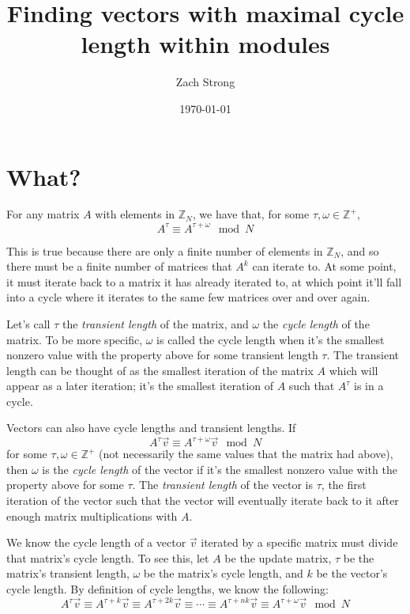 \documentclass[a4paper, 12pt, reqno]{amsart}
\title{Finding vectors with maximal cycle length within modules}
\author{Zach Strong}
\date{\today}
\begin{document}
	\maketitle
	
	\section{What?}
	For any matrix $A$ with elements in $\mathds{Z}_{N}$, we have that, for some $\tau, \omega \in \mathds{Z}^{+}$,
	\[
		A^{\tau} \equiv A^{\tau + \omega} \mod{N}
	\]
	
	This is true because there are only a finite number of elements in $\mathds{Z}_{N}$, and so there must be a
	finite number of matrices that $A^{k}$ can iterate to. At some point, it must iterate back to a matrix it
	has already iterated to, at which point it'll fall into a cycle where it iterates to the same few matrices
	over and over again.
	
	Let's call $\tau$ the \emph{transient length} of the matrix, and $\omega$ the \emph{cycle length} of the matrix.
	To be more specific, $\omega$ is called the cycle length when it's the smallest nonzero value with the
	property above for some transient length $\tau$. The transient length can be thought of as the smallest
	iteration of the matrix $A$ which will appear as a later iteration; it's the smallest iteration of $A$ such that
	$A^{\tau}$ is in a cycle.
	
	Vectors can also have cycle lengths and transient lengths. If
	\[
		A^{\tau}\vec{v} \equiv A^{\tau + \omega}\vec{v} \mod{N}
	\]
	for some $\tau, \omega \in \mathds{Z}^{+}$ (not necessarily the same values that the matrix had above), then
	$\omega$ is the \emph{cycle length} of the vector if it's the smallest nonzero value with the property above
	for some $\tau$. The \emph{transient length} of the vector is $\tau$, the first iteration of the vector such
	that the vector will eventually iterate back to it after enough matrix multiplications with $A$.
	
	We know the cycle length of a vector $\vec{v}$ iterated by a specific matrix must divide that matrix's cycle 
	length. To see this, let $A$ be the update matrix, $\tau$ be the matrix's transient length, $\omega$ be the 
	matrix's cycle length, and $k$ be the vector's cycle length. By definition of cycle lengths, we know the 
	following:
	\[
		A^{\tau}\vec{v}          \equiv 
		A^{\tau + k}\vec{v}      \equiv
		A^{\tau + 2k}\vec{v}     \equiv
		\cdots                   \equiv
		A^{\tau + nk}\vec{v}     \equiv
		A^{\tau + \omega}\vec{v} \mod{N}
	\]
	
\end{document}
